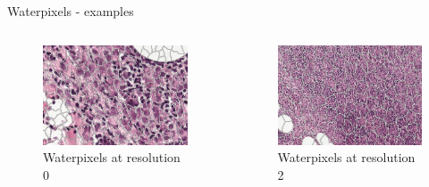 \documentclass{beamer}
\begin{document}
\begin{frame}[noframenumbering]{Waterpixels - examples}
\begin{columns}[T] %

\begin{column}{.3\textwidth}
\begin{figure}[!ht]
\centering
\includegraphics[width=\textwidth]{waterpix_res0.png}
\caption{Waterpixels at resolution 0}
\label{}
\end{figure}
\end{column}%

\begin{column}{.3\textwidth}
\begin{figure}[!ht]
\centering
\includegraphics[width=\textwidth]{waterpix_res2.png}
\caption{Waterpixels at resolution 2}
\label{}
\end{figure}
\end{column}%


\end{columns}
\end{frame}
\end{document}
